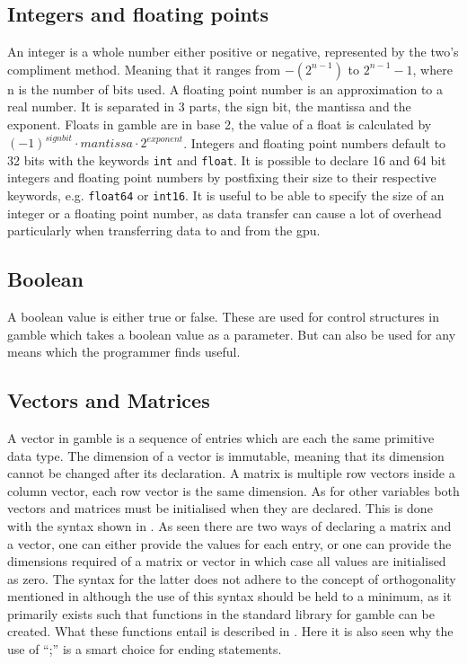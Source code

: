 \subsection*{Integers and floating points}
An integer is a whole number either positive or negative, represented by the two's compliment method. 
Meaning that it ranges from $-(2^{n-1}) $ to $2^{n-1} - 1 $, where n is the number of bits used.
A floating point number is an approximation to a real number. 
It is separated in 3 parts, the sign bit, the mantissa and the exponent. 
Floats in \gls{gamble} are in base 2, the value of a float is calculated by $ (-1)^{sign bit} \cdot mantissa \cdot 2^{exponent} $. 
Integers and floating point numbers default to 32 bits with the keywords \texttt{int} and \texttt{float}. 
It is possible to declare 16 and 64 bit integers and floating point numbers by postfixing their size to their respective keywords, e.g. \texttt{float64} or \texttt{int16}. 
It is useful to be able to specify the size of an integer or a floating point number, as data transfer can cause a lot of overhead particularly when transferring data to and from the \acrshort{gpu}. 

\subsection*{Boolean}
A boolean value is either true or false. 
These are used for control structures in \gls{gamble} which takes a boolean value as a parameter. 
But can also be used for any means which the programmer finds useful. 

\subsection*{Vectors and Matrices}
A vector in \gls{gamble} is a sequence of entries which are each the same primitive data type. 
The dimension of a vector is immutable, meaning that its dimension cannot be changed after its declaration. 
A matrix is multiple row vectors inside a column vector, each row vector is the same dimension. 
As for other variables both vectors and matrices must be initialised when they are declared. 
This is done with the syntax shown in .
As seen there are two ways of declaring a matrix and a vector, one can either provide the values for each entry, or one can provide the dimensions required of a matrix or vector in which case all values are initialised as zero.
The syntax for the latter does not adhere to the concept of orthogonality mentioned in  although the use of this syntax should be held to a minimum, as it primarily exists such that functions in the standard library for \gls{gamble} can be created.
What these functions entail is described in .
Here it is also seen why the use of ``;'' is a smart choice for ending statements.

